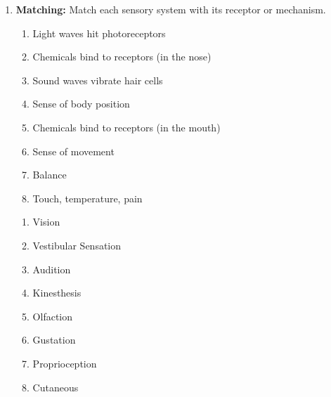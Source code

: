 \begin{enumerate}[label=\textbf{Q2.7.\arabic*}]
      \item \textbf{Matching:} Match each sensory system with its receptor or mechanism.
            \begin{wordbox}
                  \begin{enumerate}[label=(\alph*)]
                        \item Light waves hit photoreceptors
                        \item Chemicals bind to receptors (in the nose)
                        \item Sound waves vibrate hair cells
                        \item Sense of body position
                        \item Chemicals bind to receptors (in the mouth)
                        \item Sense of movement
                        \item Balance
                        \item Touch, temperature, pain
                  \end{enumerate}
            \end{wordbox}
            \begin{enumerate}[label=(\arabic*)]
                  \item Vision \quad \dotfill \quad \underline{\hspace{1cm}} \\
                  \item Vestibular Sensation \quad \dotfill \quad \underline{\hspace{1cm}} \\
                  \item Audition \quad \dotfill \quad \underline{\hspace{1cm}} \\
                  \item Kinesthesis \quad \dotfill \quad \underline{\hspace{1cm}} \\
                  \item Olfaction \quad \dotfill \quad \underline{\hspace{1cm}} \\
                  \item Gustation \quad \dotfill \quad \underline{\hspace{1cm}} \\
                  \item Proprioception \quad \dotfill \quad \underline{\hspace{1cm}} \\
                  \item Cutaneous \quad \dotfill \quad \underline{\hspace{1cm}} 
            \end{enumerate}
            

\end{enumerate}
